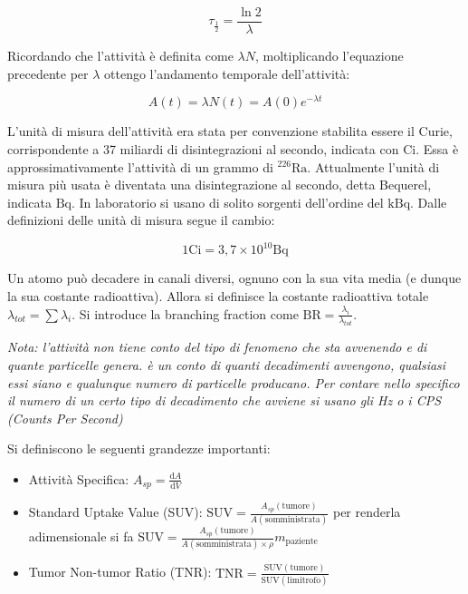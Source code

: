 \begin{equation}
\tau_{\frac{1}{2}}=\frac{\ln2}{\lambda}
\end{equation}

Ricordando che l'attività è definita come $\lambda N$, moltiplicando l'equazione precedente per $\lambda$ ottengo l'andamento temporale dell'attività:

\begin{equation}
A(t)=\lambda N(t)=A(0)e^{-\lambda t}
\end{equation}

L'unità di misura dell'attività era stata per convenzione stabilita essere il Curie, corrispondente a 37 miliardi di disintegrazioni al secondo, indicata con $\text{Ci}$. Essa è approssimativamente l'attività di un grammo di $^{226}\text{Ra}$.
Attualmente l'unità di misura più usata è diventata una disintegrazione al secondo, detta Bequerel, indicata $\text{Bq}$.
In laboratorio si usano di solito sorgenti dell'ordine del $\text{kBq}$. Dalle definizioni delle unità di misura segue il cambio:

\begin{equation}
1 \text{Ci} = 3,7 \times 10^{10} \text{Bq}
\end{equation}

Un atomo può decadere in canali diversi, ognuno con la sua vita media (e dunque la sua costante radioattiva). Allora si definisce la costante radioattiva totale $\lambda_{tot}=\sum \lambda_{i}$. Si introduce la branching fraction come $\text{BR}=\frac{\lambda_i}{\lambda_{tot}}$.

\emph{Nota: l'attività non tiene conto del tipo di fenomeno che sta avvenendo e di quante particelle genera. è un conto di quanti decadimenti avvengono, qualsiasi essi siano e qualunque numero di particelle producano. Per contare nello specifico il numero di un certo tipo di decadimento che avviene si usano gli Hz o i CPS (Counts Per Second)}

Si definiscono le seguenti grandezze importanti:
\begin{itemize}
\item Attività Specifica: $A_{sp}=\frac{\mathrm{d}A}{\mathrm{d}V}$
\item Standard Uptake Value (SUV): $\text{SUV}=\frac{A_{sp}(\text{tumore})}{A(\text{somministrata})}$ per renderla adimensionale si fa $\text{SUV}=\frac{A_{sp}(\text{tumore})}{A(\text{somministrata})\times \rho}m_{\text{paziente}}$
\item Tumor Non-tumor Ratio (TNR): $\text{TNR}=\frac{\text{SUV}(\text{tumore})}{\text{SUV}(\text{limitrofo})}$
\end{itemize}

